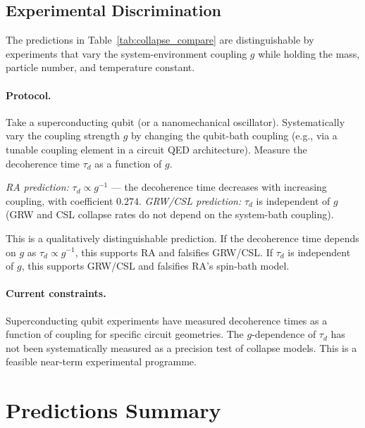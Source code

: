 \documentclass[12pt,a4paper]{article}
\begin{document}
\subsection{Experimental Discrimination}

The predictions in Table~\ref{tab:collapse_compare} are distinguishable by experiments that vary the system-environment coupling $g$ while holding the mass, particle number, and temperature constant.

\paragraph{Protocol.}  Take a superconducting qubit (or a nanomechanical oscillator).  Systematically vary the coupling strength $g$ by changing the qubit-bath coupling (e.g., via a tunable coupling element in a circuit QED architecture).  Measure the decoherence time $\tau_d$ as a function of $g$.

\textit{RA prediction:} $\tau_d\propto g^{-1}$ --- the decoherence time decreases with increasing coupling, with coefficient $0.274$.
\textit{GRW/CSL prediction:} $\tau_d$ is independent of $g$ (GRW and CSL collapse rates do not depend on the system-bath coupling).

This is a qualitatively distinguishable prediction.  If the decoherence time depends on $g$ as $\tau_d\propto g^{-1}$, this supports RA and falsifies GRW/CSL.  If $\tau_d$ is independent of $g$, this supports GRW/CSL and falsifies RA's spin-bath model.

\paragraph{Current constraints.}  Superconducting qubit experiments have measured decoherence times as a function of coupling for specific circuit geometries.  The $g$-dependence of $\tau_d$ has not been systematically measured as a precision test of collapse models.  This is a feasible near-term experimental programme.

\section{Predictions Summary}\label{sec:predictions}
\end{document}
